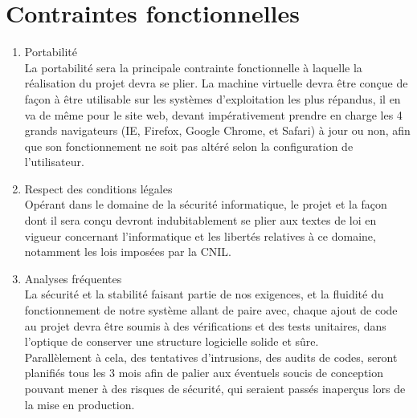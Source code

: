 \section{Contraintes fonctionnelles}
\begin{enumerate}
\item Portabilité\\
La portabilité sera la principale contrainte fonctionnelle à laquelle la réalisation du projet devra se plier.
La machine virtuelle devra être conçue de façon à être utilisable sur les systèmes d'exploitation les plus répandus, il en va de même pour le site web, devant impérativement prendre en charge les 4 grands navigateurs (IE, Firefox, Google Chrome, et Safari) à jour ou non, afin que son fonctionnement ne soit pas altéré selon la configuration de l’utilisateur.\\
\item Respect des conditions légales\\
Opérant dans le domaine de la sécurité informatique, le projet et la façon dont il sera conçu devront indubitablement se plier aux textes de loi en vigueur concernant l’informatique et les libertés relatives à ce domaine, notamment les lois imposées par la CNIL.\\
\item Analyses fréquentes\\
La sécurité et la stabilité faisant partie de nos exigences, et la fluidité du fonctionnement de notre système allant de paire avec, chaque ajout de code au projet devra être soumis à des vérifications et des tests unitaires, dans l'optique de conserver une structure logicielle solide et sûre.\\
Parallèlement à cela, des tentatives d'intrusions, des audits de codes, seront planifiés tous les 3 mois afin de palier aux éventuels soucis de conception pouvant mener à des risques de sécurité, qui seraient passés inaperçus lors de la mise en production.\\
\end{enumerate}
